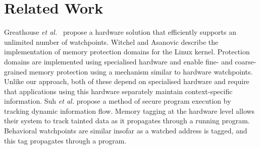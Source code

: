 \documentclass[letterpaper,twocolumn,10pt]{article}
\begin{document}






\section{Related Work}

Greathouse \emph{et al.}~\cite{UnlimitedWatchpoints} propose a hardware solution that efficiently supports an unlimited number of watchpoints. Witchel and Asanovic \cite{Mondrix} describe the implementation of memory protection domains for the Linux kernel. Protection domains are implemented using specialised hardware and enable fine- and coarse-grained memory protection using a mechanism similar to hardware watchpoints. Unlike our approach, both of these depend on specialised hardware and require that applications using this hardware separately maintain context-specific information. Suh \emph{et al.} \cite{SecureProgramExecFlowTracking} propose a method of secure program execution by tracking dynamic information flow. Memory tagging at the hardware level allows their system to track tainted data as it propagates through a running program. Behavioral watchpoints are similar insofar as a watched address is tagged, and this tag propagates through a program.
\end{document}
